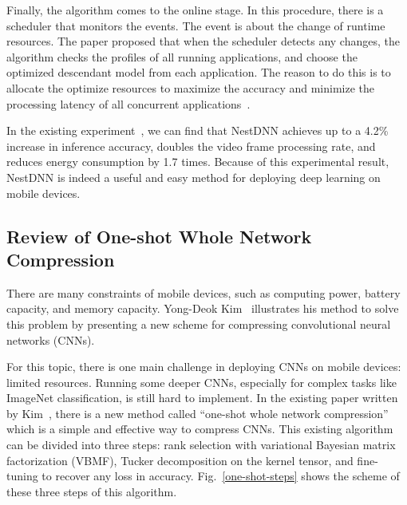 \documentclass{article}
\begin{document}
Finally, the algorithm comes to the online stage. In this procedure, there is a scheduler that monitors the events. The event is about the change of runtime resources. The paper proposed that when the scheduler detects any changes, the algorithm checks the profiles of all running applications, and choose the optimized descendant model from each application. The reason to do this is to allocate the optimize resources to maximize the accuracy and minimize the processing latency of all concurrent applications~\cite{fang2018nestdnn}. 

In the existing experiment~\cite{fang2018nestdnn}, we can find that NestDNN achieves up to a 4.2\% increase in inference accuracy, doubles the video frame processing rate, and reduces energy consumption by 1.7 times. Because of this experimental result, NestDNN is indeed a useful and easy method for deploying deep learning on mobile devices.


\subsection{Review of One-shot Whole Network Compression}
There are many constraints of mobile devices, such as computing power, battery capacity, and memory capacity. Yong-Deok Kim~\cite{kim2016compression} illustrates his method to solve this problem by presenting a new scheme for compressing convolutional neural networks (CNNs).

For this topic, there is one main challenge in deploying CNNs on mobile devices: limited resources. Running some deeper CNNs, especially for complex tasks like ImageNet classification, is still hard to implement. In the existing paper written by Kim~\cite{kim2016compression}, there is a new method called “one-shot whole network compression” which is a simple and effective way to compress CNNs. This existing algorithm can be divided into three steps: rank selection with variational Bayesian matrix factorization (VBMF), Tucker decomposition on the kernel tensor, and fine-tuning to recover any loss in accuracy. Fig.~\ref{one-shot-steps} shows the scheme of these three steps of this algorithm.

\end{document}
